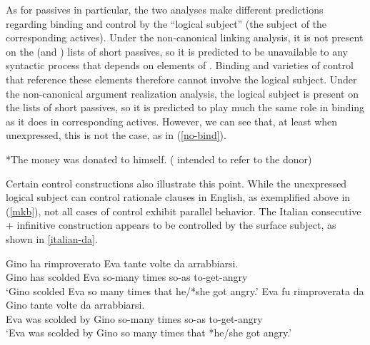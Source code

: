 \documentclass[output=paper
                ,modfonts
                ,nonflat
	        ,collection
	        ,collectionchapter
	        ,collectiontoclongg
 	        ,biblatex
                ,babelshorthands
                ,newtxmath
                ,draftmode
                ,colorlinks, citecolor=brown
]{./langsci/langscibook}
\begin{document}
As for passives in particular, the two analyses make different predictions regarding binding and control by the ``logical subject'' (the subject of the corresponding actives).
Under the non-canonical linking analysis, it is not present on the \argst (and \val) lists of short passives, so it is predicted to be unavailable to any syntactic process that depends on elements of \argst.
Binding and varieties of control that reference these elements therefore cannot involve the logical subject.
Under the non-canonical argument realization analysis, the logical subject is present on the \argst lists of short passives, so it is predicted to play much the same role in binding as it does in corresponding actives.
However, we can see that, at least when unexpressed, this is not the case, as in (\ref{no-bind}).
\begin{exe}
\ex\label{no-bind}
*The money was donated to himself. ( intended to refer to the donor)
\end{exe}

Certain control constructions also illustrate this point.
While the unexpressed logical subject can control rationale clauses in English, as exemplified above in (\ref{mkb}), not all cases of control exhibit parallel behavior.
The Italian consecutive  + infinitive construction \citep{Perlmutter1984, Sanfilippo1998} appears to be controlled by the surface subject, as shown in \ref{italian-da}.


\begin{exe}
\ex     \label{italian-da}
\begin{xlist}
\ex             \gll Gino ha rimproverato Eva tante volte da arrabbiarsi.  \\
                Gino has scolded Eva so-many times so-as to-get-angry  \\
                \glt `Gino scolded Eva so many times that he/*she got angry.'
\ex             \gll Eva fu rimproverata da Gino tante volte da arrabbiarsi.  \\
                Eva was scolded by Gino so-many times so-as to-get-angry  \\
                \glt `Eva was scolded by Gino so many times that *he/she got angry.'
\end{xlist}
\end{exe}
\end{document}
